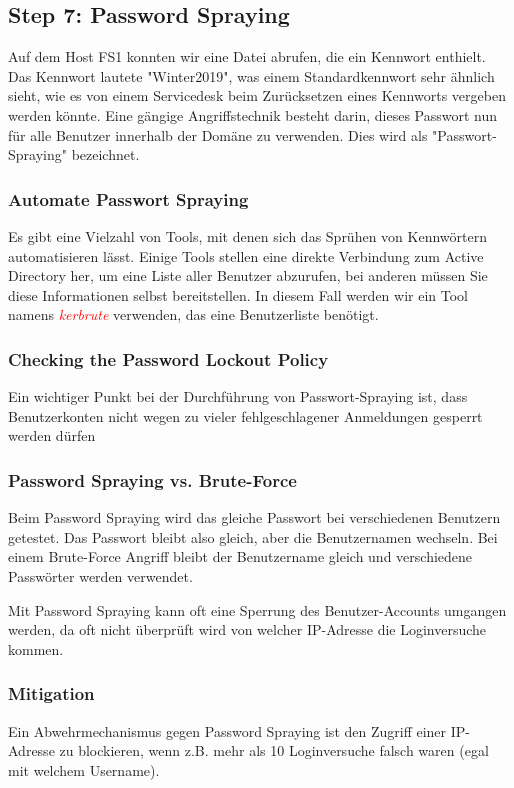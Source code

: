 \subsection{Step 7: Password Spraying}
Auf dem Host FS1 konnten wir eine Datei abrufen, die ein Kennwort enthielt. Das Kennwort lautete "Winter2019", was einem Standardkennwort sehr ähnlich sieht, wie es von einem Servicedesk beim Zurücksetzen eines Kennworts vergeben werden könnte.
Eine gängige Angriffstechnik besteht darin, dieses Passwort nun für alle Benutzer innerhalb der Domäne zu verwenden. Dies wird als "Passwort-Spraying" bezeichnet.

\subsubsection{Automate Passwort Spraying}
Es gibt eine Vielzahl von Tools, mit denen sich das Sprühen von Kennwörtern automatisieren lässt. Einige Tools stellen eine direkte Verbindung zum Active Directory her, um eine Liste aller Benutzer abzurufen, bei anderen müssen Sie diese Informationen selbst bereitstellen.
In diesem Fall werden wir ein Tool namens \textcolor{red}{\textit{kerbrute}} verwenden, das eine Benutzerliste benötigt.

\subsubsection{Checking the Password Lockout Policy}
Ein wichtiger Punkt bei der Durchführung von Passwort-Spraying ist, dass Benutzerkonten nicht wegen zu vieler fehlgeschlagener Anmeldungen gesperrt werden dürfen

\subsubsection{Password Spraying vs. Brute-Force}
Beim Password Spraying wird das gleiche Passwort bei verschiedenen Benutzern getestet. Das Passwort bleibt also gleich, aber die Benutzernamen wechseln.
Bei einem Brute-Force Angriff bleibt der Benutzername gleich und verschiedene Passwörter werden verwendet.

Mit Password Spraying kann oft eine Sperrung des Benutzer-Accounts umgangen werden, da oft nicht überprüft wird von welcher IP-Adresse die Loginversuche kommen.

\subsubsection{Mitigation}
Ein Abwehrmechanismus gegen Password Spraying ist den Zugriff einer IP-Adresse zu blockieren, wenn z.B. mehr als 10 Loginversuche falsch waren (egal mit welchem Username).

